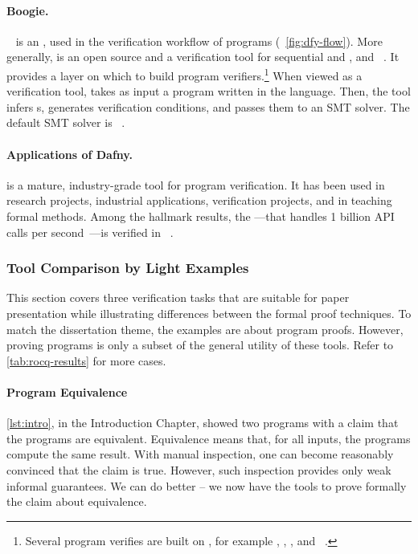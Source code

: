 \paragraph*{Boogie.}
~\cite{leino2008} is an ,
used in the verification workflow of  programs
(\cf~\autoref{fig:dfy-flow}). More generally,  is an open source
 and a verification tool for sequential and
, and ~\cite{boogie}. It
provides a layer on which to build program verifiers.\footnote{Several program
verifies are built on , for example , ,
, and ~\cite{boogie}.} When viewed as a verification
tool,  takes as input a program written in the 
language. Then, the tool infers s, generates verification
conditions, and passes them to an SMT solver. The default SMT solver is
~\cite{demoura2008}.

\paragraph*{Applications of Dafny.}
 is a mature, industry-grade tool for program verification. It has
been used in research projects, industrial applications, verification projects,
and in teaching formal methods. Among the hallmark results, the ---that handles 1 billion API calls per
second~\cite{wagner2024}---is verified in ~\cite{chakarov2025}.

\subsubsection{Tool Comparison by Light Examples}
\label{subsubsec:sm-tool-examples}

This section covers three verification tasks that are suitable for paper
presentation while illustrating differences between the formal proof techniques.
To match the dissertation theme, the examples are about program proofs. However,
proving programs is only a subset of the general utility of these tools. Refer
to \autoref{tab:rocq-results} for more cases.

\paragraph{Program Equivalence}

\autoref{lst:intro}, in the Introduction Chapter, showed two programs with a
claim that the programs are equivalent. Equivalence means that, for all inputs,
the programs compute the same result. With manual inspection, one can become
reasonably convinced that the claim is true. However, such inspection provides
only weak informal guarantees. We can do better -- we now have the tools to
prove formally the claim about equivalence.


